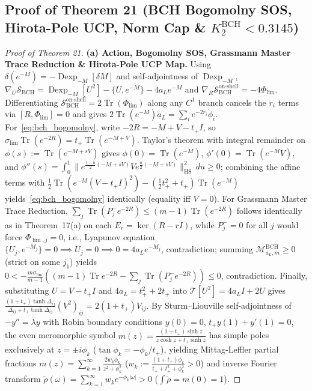 \documentclass[10pt,letterpaper]{article}
\newcommand{\Tr}{\operatorname{Tr}}
\newcommand{\HS}{\mathrm{HS}}
\newcommand{\Dexp}{\operatorname{Dexp}}
\begin{document}
\subsection{Proof of Theorem 21 (BCH Bogomolny SOS, Hirota-Pole UCP, Norm Cap \& \texorpdfstring{$K_2^{\mathrm{BCH}} < 0.3145$}{K2 < 0.3145})}

\begin{proof}[Proof of Theorem 21]
\textbf{(a) Action, Bogomolny SOS, Grassmann Master Trace Reduction \& Hirota-Pole UCP Map.}
Using $\delta(e^{-M}) = -\Dexp_{-M}[\delta M]$ and self-adjointness of $\Dexp_{-M}$, $\nabla_U\mathcal{S}_{\mathrm{BCH}} = \Dexp_{-M}[U^2] - \{U, e^{-M}\} - 4a_L e^{-M}$ and $\nabla_R\mathcal{S}_{\mathrm{BCH}}^{\text{on-shell}} = -4\Phi_{\lim}$. Differentiating $\mathcal{S}_{\mathrm{BCH}}^{\text{on-shell}} = 2\Tr(\Phi_{\lim})$ along any $C^1$ branch cancels the $\dot{r}_i$ terms via $[R, \Phi_{\lim}] = 0$ and gives $2\Tr(e^{-M})\dot{a}_L = \sum_i e^{-2r_i}\dot{\phi}_i$. For~\eqref{eq:bch_bogomolny}, write $-2R = -M + V - t_+ I$, so $\sigma_{\lim}\Tr(e^{-2R}) = t_+\Tr(e^{-M+V})$. Taylor's theorem with integral remainder on $\phi(s) := \Tr(e^{-M+sV})$ gives $\phi(0) = \Tr(e^{-M})$, $\phi'(0) = \Tr(e^{-M}V)$, and $\phi''(s) = \int_0^1 \|e^{\frac{1-u}{2}(-M+sV)}Ve^{\frac{u}{2}(-M+sV)}\|_{\HS}^2\,du \ge 0$; combining the affine terms with $\frac{1}{2}\Tr(e^{-M}(V-t_+ I)^2) - (\frac{1}{2}t_+^2+t_+)\Tr(e^{-M})$ yields~\eqref{eq:bch_bogomolny} identically (equality iff $V = 0$). For Grassmann Master Trace Reduction, $\sum_j \Tr(P_j^- e^{-2R}) \le (m-1)\Tr(e^{-2R})$ follows identically as in Theorem~17(a) on each $E_r = \ker(R - rI)$, while $P_j^- = 0$ for all $j$ would force $\Phi_{\lim,j} = 0$, i.e., Lyapunov equation $\{U_j, e^{-M_j}\} = 0 \implies U_j = 0 \implies 0 = 4a_L e^{-M_j}$, contradiction; summing $\mathcal{M}_{a_L,m}^{\mathrm{BCH}} \ge 0$ (strict on some $j_1$) yields $0 < -\frac{m\sigma_{\lim}}{m-1}((m-1)\Tr e^{-2R} - \sum_j \Tr(P_j^- e^{-2R})) \le 0$, contradiction. Finally, substituting $U = V - t_+ I$ and $4a_L = t_+^2 + 2t_+$ into $\mathcal{T}[U^2] = 4a_L I + 2U$ gives $\frac{(1+t_+)\tanh\Delta_{ij}}{\Delta_{ij} + t_+\tanh\Delta_{ij}}(V^2)_{ij} = 2(1+t_+) V_{ij}$. By Sturm--Liouville self-adjointness of $-y'' = \lambda y$ with Robin boundary conditions $y(0) = 0$, $t_+ y(1) + y'(1) = 0$, the even meromorphic symbol $m(z) = \frac{(1+t_+)\sinh z}{z\cosh z + t_+\sinh z}$ has simple poles exclusively at $z = \pm i\phi_k$ ($\tan\phi_k = -\phi_k/t_+$), yielding Mittag-Leffler partial fractions $m(z) = \sum_{k=1}^\infty \frac{2 w_k\phi_k}{z^2 + \phi_k^2}$ ($w_k := \frac{(1+t_+)\phi_k}{t_+ + t_+^2 + \phi_k^2} > 0$) and inverse Fourier transform $\tilde{\rho}(\omega) = \sum_{k=1}^\infty w_k e^{-\phi_k|\omega|} > 0$ ($\int \tilde{\rho} = m(0) = 1$).


\end{proof}
\end{document}
